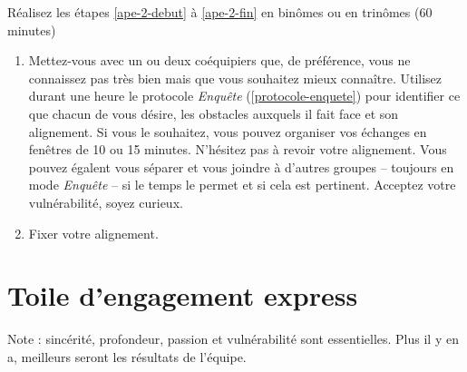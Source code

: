 \documentclass[11pt]{book}
\newcommand*{\numref}[1]{{\hyperref[{#1}]{\autoref*{#1}}}}
\let\oldsection\section
\renewcommand\section{\clearpage\oldsection}
\begin{document}
Réalisez les étapes \ref{ape-2-debut} à \ref{ape-2-fin} en binômes ou en trinômes (60 minutes)

\begin{enumerate}[resume]
	\item \label{ape-2-debut} Mettez-vous avec un ou deux coéquipiers que, de préférence, vous ne connaissez pas très bien mais que vous souhaitez mieux
	      connaître. Utilisez durant une heure le protocole \emph{Enquête} (\numref{protocole-enquete}) pour identifier ce que chacun de vous désire, 
	      les obstacles auxquels il fait face et son alignement. Si vous le souhaitez, vous pouvez organiser vos échanges en fenêtres de 10 ou 15 minutes.
	      N'hésitez pas à revoir votre alignement. Vous pouvez égalent vous séparer et vous joindre à d'autres groupes -- toujours en mode 
	      \emph{Enquête} -- si le temps le permet et si cela est pertinent. Acceptez votre vulnérabilité, soyez curieux.
	\item \label{ape-2-fin} Fixer votre alignement.
\end{enumerate}

\section{Toile d'engagement express} \label{toile-engagement-express}

Note : sincérité, profondeur, passion et vulnérabilité sont essentielles. Plus il y en a, meilleurs seront les résultats de l'équipe.
\end{document}

